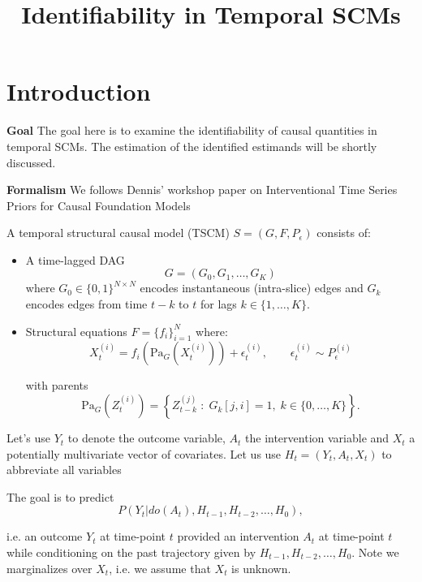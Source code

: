 \documentclass[11pt]{article}
\title{Identifiability in Temporal SCMs}
\author{}
\theoremstyle{definition}
\theoremstyle{remark}
\begin{document}
\maketitle

\section{Introduction}

\textbf{Goal} The goal here is to examine the identifiability of causal quantities in temporal SCMs. The estimation of the identified estimands will be shortly discussed. 

\textbf{Formalism} We follows Dennis' workshop paper on Interventional Time Series Priors for Causal Foundation Models

A temporal structural causal model (TSCM) $S = (G,F,P_{\epsilon})$ consists of:

\begin{itemize}

\item A time-lagged DAG 
\[
G = (G_0, G_1, \dots, G_K)
\]
where $G_0 \in \{0,1\}^{N \times N}$ encodes instantaneous (intra-slice) edges and $G_k$ encodes edges from time $t-k$ to $t$ for lags $k \in \{1,\dots,K\}$.

\item Structural equations $F = \{f_i\}_{i=1}^N$ where:
\begin{equation}
X_t^{(i)} =
f_i\!\left(
\mathrm{Pa}_G(X_t^{(i)})
\right)
+
\epsilon_t^{(i)},
\qquad
\epsilon_t^{(i)} \sim P_\epsilon^{(i)}
\end{equation}

with parents
\[
\mathrm{Pa}_G(Z_t^{(i)}) =
\left\{
Z_{t-k}^{(j)}
\;:\;
G_k[j,i] = 1,\;
k \in \{0,\dots,K\}
\right\}.
\]

\end{itemize}

Let's use $Y_t$ to denote the outcome variable, $A_t$ the intervention variable and $X_t$ a potentially multivariate vector of covariates. Let us use $H_t = (Y_t, A_t, X_t)$ to abbreviate all variables 

The goal is to predict
\begin{equation}
    P(Y_t| do(A_t), H_{t-1}, H_{t-2}, \ldots, H_0), 
\end{equation}

i.e. an outcome $Y_t$ at time-point $t$ provided an intervention $A_t$ at time-point $t$ while conditioning on the past trajectory given by $H_{t-1}, H_{t-2}, \ldots, H_0$. Note we marginalizes over $X_t$, i.e.  we assume that $X_t$ is unknown. 
\end{document}
